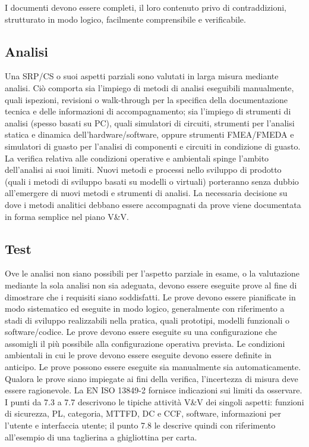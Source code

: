 I documenti devono essere completi, il loro contenuto privo di contraddizioni, strutturato in modo logico, facilmente comprensibile e verificabile.

\subsection{Analisi}
\label{subsec:07-1-5}
Una SRP/CS o suoi aspetti parziali sono valutati in larga misura mediante analisi. Ciò comporta sia l'impiego di metodi di analisi eseguibili manualmente, quali ispezioni, revisioni o walk-through per la specifica della documentazione tecnica e delle informazioni di accompagnamento; sia l'impiego di strumenti di analisi (spesso basati su PC), quali simulatori di circuiti, strumenti per l'analisi statica e dinamica dell'hardware/software, oppure strumenti FMEA/FMEDA e simulatori di guasto per l'analisi di componenti e circuiti in condizione di guasto. La verifica relativa alle condizioni operative e ambientali spinge l'ambito dell'analisi ai suoi limiti. Nuovi metodi e processi nello sviluppo di prodotto (quali i metodi di sviluppo basati su modelli o virtuali) porteranno senza dubbio all'emergere di nuovi metodi e strumenti di analisi. La necessaria decisione su dove i metodi analitici debbano essere accompagnati da prove viene documentata in forma semplice nel piano V\&V.

\subsection{Test}
\label{subsec:07-1-6}
Ove le analisi non siano possibili per l'aspetto parziale in esame, o la valutazione mediante la sola analisi non sia adeguata, devono essere eseguite prove al fine di dimostrare che i requisiti siano soddisfatti. Le prove devono essere pianificate in modo sistematico ed eseguite in modo logico, generalmente con riferimento a stadi di sviluppo realizzabili nella pratica, quali prototipi, modelli funzionali o software/codice. Le prove devono essere eseguite su una configurazione che assomigli il più possibile alla configurazione operativa prevista. Le condizioni ambientali in cui le prove devono essere eseguite devono essere definite in anticipo. Le prove possono essere eseguite sia manualmente sia automaticamente.
Qualora le prove siano impiegate ai fini della verifica, l'incertezza di misura deve essere ragionevole. La EN ISO 13849-2 fornisce indicazioni sui limiti da osservare.
I punti da 7.3 a 7.7 descrivono le tipiche attività V\&V dei singoli aspetti: funzioni di sicurezza, PL, categoria, MTTFD, DC e CCF, software, informazioni per l'utente e interfaccia utente; il punto 7.8 le descrive quindi con riferimento all'esempio di una taglierina a ghigliottina per carta.

